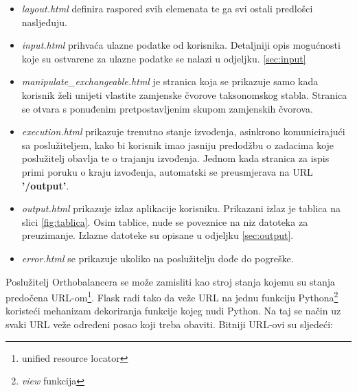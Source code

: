 \begin{itemize}

    \item \emph{layout.html} definira raspored svih elemenata te ga svi ostali
predlošci nasljeđuju.

    \item \emph{input.html} prihvaća ulazne podatke od korisnika. Detaljniji
opis mogućnosti koje su ostvarene za ulazne podatke se nalazi u odjeljku.
\ref{sec:input}

    \item \emph{manipulate\_exchangeable.html} je stranica koja se prikazuje
samo kada korisnik želi unijeti vlastite zamjenske čvorove taksonomskog stabla.
Stranica se otvara s ponuđenim pretpostavljenim skupom zamjenskih čvorova.

    \item \emph{execution.html}  prikazuje trenutno stanje izvođenja, asinkrono
komunicirajući sa poslužiteljem, kako bi korisnik imao jasniju predodžbu o
zadacima koje poslužitelj obavlja te o trajanju izvođenja. Jednom kada stranica
za ispis primi poruku o kraju izvođenja, automatski se preusmjerava na URL
\textbf{'/output'}.

    \item \emph{output.html} prikazuje izlaz aplikacije korisniku. Prikazani
izlaz je tablica na slici \ref{fig:tablica}. Osim tablice, nude se poveznice na
niz datoteka za preuzimanje. Izlazne datoteke su opisane u odjeljku
\ref{sec:output}.

    \item \emph{error.html} se prikazuje ukoliko na poslužitelju dođe do
pogreške.

\end{itemize}

Poslužitelj Orthobalancera se može zamisliti kao stroj stanja kojemu su stanja
predočena URL-om\footnote{unified resource locator}. Flask radi tako da veže
URL na jednu funkciju Pythona\footnote{\emph{view} funkcija} koristeći
mehanizam dekoriranja\cite{pep} funkcije kojeg nudi Python. Na taj se način uz
svaki URL veže određeni posao koji treba obaviti. Bitniji URL-ovi su sljedeći:

